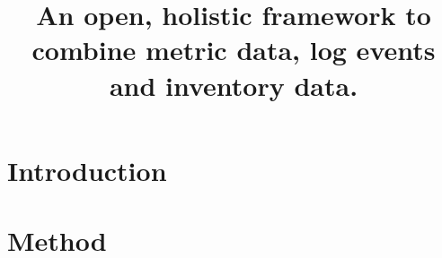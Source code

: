 \documentclass[twocolumn,showpacs,%
  nofootinbib,aps,superscriptaddress,%
  eqsecnum,prd,notitlepage,showkeys,10pt]{revtex4-1}
\begin{document}
\title{An open, holistic framework to combine metric data, log events and inventory data.}


\maketitle


\section{Introduction}

%

\section{Method}









%
\end{document}
